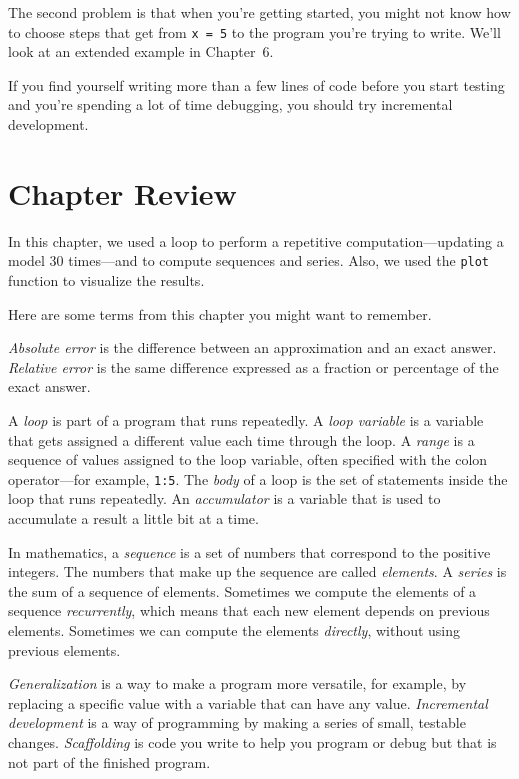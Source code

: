 The second problem is that when you're getting started, you might not know how to
choose steps that get from \lstinline{x = 5} to the program you're trying
to write.  We'll look at an extended example in Chapter~6.

If you find yourself writing more than a few lines of code before
you start testing and you're spending a lot of time debugging,
you should try incremental development.




\section{Chapter Review}

In this chapter, we used a loop to perform a repetitive computation---updating a model 30 times---and to compute sequences and series.  Also,  we used the \lstinline{plot} function to visualize the results.

Here are some terms from this chapter you might want to remember.

\emph{Absolute error} is the difference between an approximation and
an exact answer. \emph{Relative error} is the same difference expressed as a fraction or percentage of the exact answer.

A \emph{loop} is part of a program that runs repeatedly.
A \emph{loop variable} is a variable that gets assigned a different value each time through the loop.
A \emph{range} is a sequence of values assigned to the loop variable, often
specified with the colon operator---for example, \lstinline{1:5}.
The \emph{body} of a loop is the set of statements inside the loop that runs repeatedly.
An \emph{accumulator} is a variable that is used to accumulate a result a little bit at a time.

In mathematics, a \emph{sequence} is a set of numbers that correspond
to the positive integers.
The numbers that make up the sequence are called \mbox{\emph{elements}}.
A \emph{series} is the sum of a sequence of elements.
Sometimes we compute the elements of a sequence \emph{recurrently}, which means that each new element depends on previous elements.  Sometimes we can compute the elements \emph{directly}, without using previous elements.

\emph{Generalization} is a way to make a program more versatile, for example, by replacing a specific value with a variable that can have any value.
\emph{Incremental development} is a way of programming by making a series of small, testable changes.
\emph{Scaffolding} is code you write to help you program or debug but
that is not part of the finished program.


